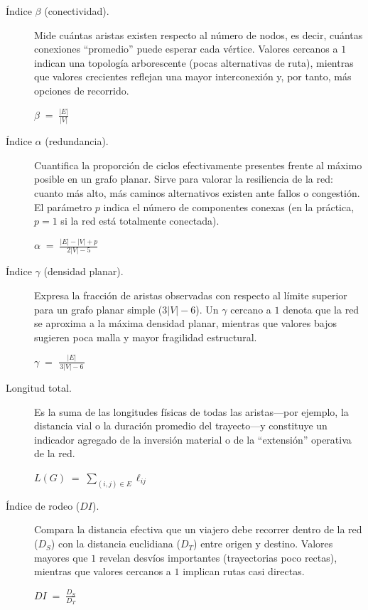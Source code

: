 \documentclass[openany]{book}
\begin{document}
		\begin{description}

		\item[Índice $\beta$ (conectividad).]
		Mide cuántas aristas existen respecto al número de nodos, es decir, cuántas conexiones “promedio” puede esperar cada vértice. Valores cercanos a $1$ indican una topología arborescente (pocas alternativas de ruta), mientras que valores crecientes reflejan una mayor interconexión y, por tanto, más opciones de recorrido.
		\begin{center}
		$\displaystyle \beta \;=\; \frac{|E|}{|V|}$
		\end{center}

		\item[Índice $\alpha$ (redundancia).]
		Cuantifica la proporción de ciclos efectivamente presentes frente al máximo posible en un grafo planar. Sirve para valorar la resiliencia de la red: cuanto más alto, más caminos alternativos existen ante fallos o congestión. El parámetro $p$ indica el número de componentes conexas (en la práctica, $p=1$ si la red está totalmente conectada).
		\begin{center}
		$\displaystyle \alpha \;=\; \frac{|E| - |V| + p}{\,2|V| - 5\,}$
		\end{center}

		\item[Índice $\gamma$ (densidad planar).]
		Expresa la fracción de aristas observadas con respecto al límite superior para un grafo planar simple ($3|V|-6$). Un $\gamma$ cercano a $1$ denota que la red se aproxima a la máxima densidad planar, mientras que valores bajos sugieren poca malla y mayor fragilidad estructural.
		\begin{center}
		$\displaystyle \gamma \;=\; \frac{|E|}{\,3|V| - 6\,}$
		\end{center}

		\item[Longitud total.]
		Es la suma de las longitudes físicas de todas las aristas—por ejemplo, la distancia vial o la duración promedio del trayecto—y constituye un indicador agregado de la inversión material o de la “extensión” operativa de la red.
		\begin{center}
		$\displaystyle L(G) \;=\; \sum_{(i,j)\in E} \ell_{ij}$
		\end{center}

		\item[Índice de rodeo ($DI$).]
		Compara la distancia efectiva que un viajero debe recorrer dentro de la red ($D_S$) con la distancia euclidiana ($D_T$) entre origen y destino. Valores mayores que $1$ revelan desvíos importantes (trayectorias poco rectas), mientras que valores cercanos a $1$ implican rutas casi directas.
		\begin{center}
		$\displaystyle DI \;=\; \frac{D_S}{D_T}$
		\end{center}


\end{description}
\end{document}
